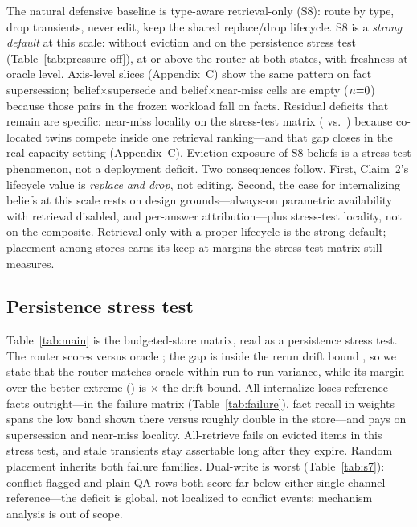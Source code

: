 \documentclass{article}
\begin{document}
The natural defensive baseline is type-aware retrieval-only (S8): route by type, drop transients, never edit, keep the shared replace/drop lifecycle. S8 is a \emph{strong default} at this scale: \SeightOffComp{} without eviction and \SeightOnComp{} on the persistence stress test (Table~\ref{tab:pressure-off}), at or above the router at both states, with freshness at oracle level. Axis-level slices (Appendix~C) show the same pattern on fact supersession; belief$\times$supersede and belief$\times$near-miss cells are empty ($n{=}0$) because those pairs in the frozen workload fall on facts. Residual deficits that remain are specific: near-miss locality on the stress-test matrix (\SeightOnLocal{} vs.\ \SfourLocal) because co-located twins compete inside one retrieval ranking---and that gap closes in the real-capacity setting (Appendix~C). Eviction exposure of S8 beliefs is a stress-test phenomenon, not a deployment deficit. Two consequences follow. First, Claim~2's lifecycle value is \emph{replace and drop}, not editing. Second, the case for internalizing beliefs at this scale rests on design grounds---always-on parametric availability with retrieval disabled, and per-answer attribution---plus stress-test locality, not on the composite. Retrieval-only with a proper lifecycle is the strong default; placement among stores earns its keep at margins the stress-test matrix still measures.

\subsection{Persistence stress test}
\label{sec:results-main}

Table~\ref{tab:main} is the budgeted-store matrix, read as a persistence stress test. The router scores \SfiveComp{} versus oracle \SfourComp{}; the gap \GapOracleRouter{} is inside the rerun drift bound \DriftBound, so we state that the router matches oracle within run-to-run variance, while its margin over the better extreme (\LeadExtremes) is \DriftMultiple$\times$ the drift bound. All-internalize loses reference facts outright---in the failure matrix (Table~\ref{tab:failure}), fact recall in weights spans the low band shown there versus roughly double in the store---and pays on supersession and near-miss locality. All-retrieve fails on evicted items in this stress test, and stale transients stay assertable long after they expire. Random placement inherits both failure families. Dual-write is worst (Table~\ref{tab:s7}): conflict-flagged and plain QA rows both score far below either single-channel reference---the deficit is global, not localized to conflict events; mechanism analysis is out of scope.
\end{document}
